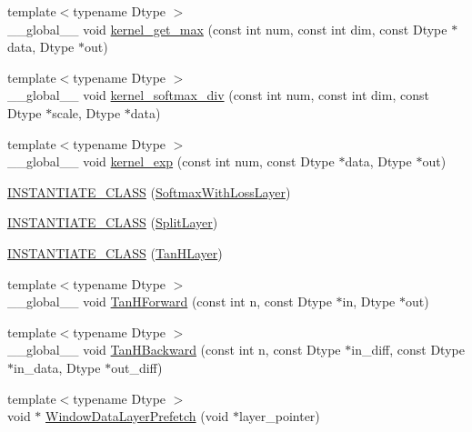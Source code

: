 \begin{DoxyCompactItemize}
\item 
{\footnotesize template$<$typename Dtype $>$ }\\\+\_\+\+\_\+global\+\_\+\+\_\+ void \hyperlink{namespacecaffe_ada77c3264b07ddfc2c1753c7331b8b09}{kernel\+\_\+get\+\_\+max} (const int num, const int dim, const Dtype $\ast$data, Dtype $\ast$out)
\item 
{\footnotesize template$<$typename Dtype $>$ }\\\+\_\+\+\_\+global\+\_\+\+\_\+ void \hyperlink{namespacecaffe_a11ed3b27ece2c308c54197b97026736b}{kernel\+\_\+softmax\+\_\+div} (const int num, const int dim, const Dtype $\ast$scale, Dtype $\ast$data)
\item 
{\footnotesize template$<$typename Dtype $>$ }\\\+\_\+\+\_\+global\+\_\+\+\_\+ void \hyperlink{namespacecaffe_a77d45a889e472a1bd13458be8b5f8201}{kernel\+\_\+exp} (const int num, const Dtype $\ast$data, Dtype $\ast$out)
\item 
\hyperlink{namespacecaffe_a012dfaa945f436a700b3f0dbf033c893}{I\+N\+S\+T\+A\+N\+T\+I\+A\+T\+E\+\_\+\+C\+L\+A\+S\+S} (\hyperlink{classcaffe_1_1_softmax_with_loss_layer}{Softmax\+With\+Loss\+Layer})
\item 
\hyperlink{namespacecaffe_a760dd19eb7d418a3629ce7045fe56a6c}{I\+N\+S\+T\+A\+N\+T\+I\+A\+T\+E\+\_\+\+C\+L\+A\+S\+S} (\hyperlink{classcaffe_1_1_split_layer}{Split\+Layer})
\item 
\hyperlink{namespacecaffe_a51e7e7c425ce80cbaec01110d4d7e914}{I\+N\+S\+T\+A\+N\+T\+I\+A\+T\+E\+\_\+\+C\+L\+A\+S\+S} (\hyperlink{classcaffe_1_1_tan_h_layer}{Tan\+H\+Layer})
\item 
{\footnotesize template$<$typename Dtype $>$ }\\\+\_\+\+\_\+global\+\_\+\+\_\+ void \hyperlink{namespacecaffe_ab089b388f7d65d79e0d0e4101b097149}{Tan\+H\+Forward} (const int n, const Dtype $\ast$in, Dtype $\ast$out)
\item 
{\footnotesize template$<$typename Dtype $>$ }\\\+\_\+\+\_\+global\+\_\+\+\_\+ void \hyperlink{namespacecaffe_aea4024694e00e9eea4d70dc76d0789bb}{Tan\+H\+Backward} (const int n, const Dtype $\ast$in\+\_\+diff, const Dtype $\ast$in\+\_\+data, Dtype $\ast$out\+\_\+diff)
\item 
{\footnotesize template$<$typename Dtype $>$ }\\void $\ast$ \hyperlink{namespacecaffe_a3d9c1901651a78a2faebd1219bb08956}{Window\+Data\+Layer\+Prefetch} (void $\ast$layer\+\_\+pointer)
\item 

\end{DoxyCompactItemize}
